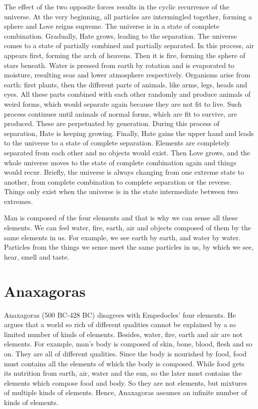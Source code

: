 \documentclass[11pt]{article}
\begin{document}
The effect of the two opposite forces results in the cyclic recurrence of the universe. 
At the very beginning, all particles are intermingled together, forming a sphere and Love reigns supreme. 
The universe is in a state of complete combination. 
Gradually, Hate grows, leading to the separation. 
The universe comes to a state of partially combined and partially separated. 
In this process, air appears first, forming the arch of heavens. 
Then it is fire, forming the sphere of stars beneath. 
Water is pressed from earth by rotation and is evaporated to moisture, resulting seas and lower atmosphere respectively. 
Organisms arise from earth: 
first plants, then the different parts of animals, like arms, legs, heads and eyes. 
All these parts combined with each other randomly and produce animals of weird forms, which would separate again because they are not fit to live. 
Such process continues until animals of normal forms, which are fit to survive, are produced. 
These are perpetuated by generation. 
During this process of separation, Hate is keeping growing. 
Finally, Hate gains the upper hand and leads to the universe to a state of complete separation. 
Elements are completely separated from each other and no objects would exist. 
Then Love grows, and the whole universe moves to the state of complete combination again and things would recur. 
Briefly, the universe is always changing from one extreme state to another, from complete combination to complete separation or the reverse. 
Things only exist when the universe is in the state intermediate between two extremes. 

\newline

Man is composed of the four elements and that is why we can sense all these elements. 
We can feel water, fire, earth, air and objects composed of them by the same elements in us. 
For example, we see earth by earth, and water by water. 
Particles from the things we sense meet the same particles in us, by which we see, hear, smell and taste.
  
\section{Anaxagoras}
Anaxagoras (500 BC-428 BC) disagrees with Empedocles’ four elements. 
He argues that a world so rich of different qualities cannot be explained by a so limited number of kinds of elements. 
Besides, water, fire, earth and air are not elements. 
For example, man’s body is composed of skin, bone, blood, flesh and so on. 
They are all of different qualities. 
Since the body is nourished by food, food must contains all the elements of which the body is composed. 
While food gets its nutrition from earth, air, water and the sun, so the later must contains the elements which compose food and body. 
So they are not elements, but mixtures of multiple kinds of elements. 
Hence, Anaxagoras assumes an infinite number of kinds of elements. 
\end{document}
